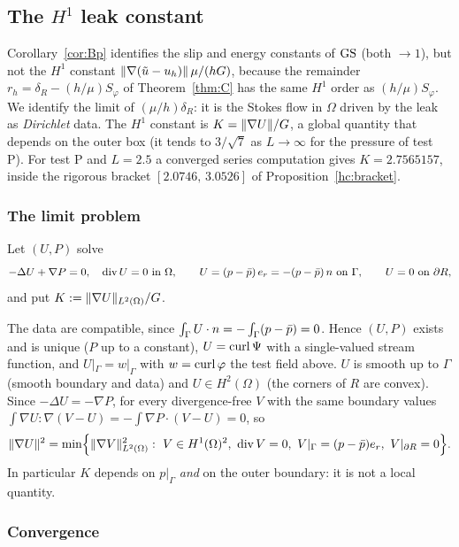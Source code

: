 \subsection{The \texorpdfstring{$H^1$}{H1} leak constant}\label{hc:sec}

Corollary~\ref{cor:Bp} identifies the slip and energy constants of $\mathrm{GS}$ (both $\to1$), but not the $H^1$ constant
$\lVert \nabla(\tilde u-u_h)\rVert\,\mu/(hG)$, because the remainder $r_h=\delta_R-(h/\mu)S_\varphi$ of Theorem~\ref{thm:C} has the same
$H^1$ order as $(h/\mu)S_\varphi$. We identify the limit of $(\mu/h)\delta_R$: it is the Stokes flow in $\Omega$ driven by the
leak as \emph{Dirichlet} data. The $H^1$ constant is $K=\lVert \nabla U\rVert/G$, a global quantity that depends on the outer
box (it tends to $3/\sqrt7$ as $L\to\infty$ for the pressure of test P). For test P and $L=2.5$ a converged series computation gives
$K=2.7565157$, inside the rigorous bracket $[2.0746,\,3.0526]$ of Proposition~\ref{hc:bracket}.

\subsubsection{The limit problem}

\begin{definition}\label{hc:def}
Let $(U,P)$ solve
\[
-\Delta U+\nabla P=0,\quad \div U=0\ \text{in }\Omega,\qquad U=(p-\pbar)\,e_r=-(p-\pbar)\,n\ \text{on }\Gamma,\qquad U=0\ \text{on }\partial R ,
\]
and put $K:=\lVert \nabla U\rVert_{L^2(\Omega)}/G$.
\end{definition}

The data are compatible, since $\int_\Gamma U\cdot n=-\int_\Gamma(p-\bar p)=0$. Hence $(U,P)$ exists and is unique ($P$ up to
a constant), $U=\operatorname{curl}\Psi$ with a single-valued stream function, and $U|_\Gamma=w|_\Gamma$ with $w=\operatorname{curl}\varphi$ the test field
above. $U$ is smooth up to $\Gamma$ (smooth boundary and data) and $U\in H^2(\Omega)$ (the corners of $R$
are convex). Since $-\Delta U=-\nabla P$, for every divergence-free $V$ with the same boundary values
$\int\nabla U:\nabla(V-U)=-\int\nabla P\cdot(V-U)=0$, so
\begin{equation}\label{hc:min}
\lVert \nabla U\rVert^2=\min\Bigl\{\lVert \nabla V\rVert^2_{L^2(\Omega)}:\ V\in H^1(\Omega)^2,\ \operatorname{div} V=0,\ V|_\Gamma=(p-\bar p)e_r,\ V|_{\partial R}=0\Bigr\}.
\end{equation}
In particular $K$ depends on $p|_\Gamma$ \emph{and} on the outer boundary: it is not a local quantity.

\subsubsection{Convergence}

